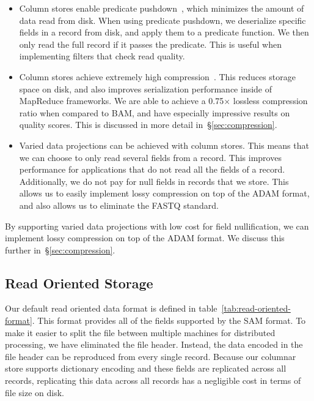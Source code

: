 \documentclass[10pt,twocolumn]{article}
\begin{document}
\begin{itemize}
\item Column stores enable predicate pushdown~\cite{lamb12}, which minimizes the amount of data read from disk. When
using predicate pushdown, we deserialize specific fields in a record from disk, and apply them to a predicate function. We
then only read the full record if it passes the predicate. This is useful when implementing filters that check read quality.
\item Column stores achieve extremely high compression~\cite{abadi06}. This reduces storage space on disk, and also improves
serialization performance inside of MapReduce frameworks. We are able to achieve a 0.75$\times$ lossless compression
ratio when compared to BAM, and have especially impressive results on quality scores. This is discussed in more
detail in~\S\ref{sec:compression}.
\item Varied data projections can be achieved with column stores. This means that we can choose to only read several
fields from a record. This improves performance for applications that do not read all the fields of a record. Additionally,
we do not pay for null fields in records that we store. This allows us to easily implement lossy compression on top of the
ADAM format, and also allows us to eliminate the FASTQ standard.
\end{itemize}

By supporting varied data projections with low cost for field nullification, we can implement lossy compression on top
of the ADAM format. We discuss this further in~\S\ref{sec:compression}.

\subsection{Read Oriented Storage}
\label{sec:read-oriented-storage}

Our default read oriented data format is defined in table~\ref{tab:read-oriented-format}. This format provides all of the
fields supported by the SAM format. To make it easier to split the file between multiple machines for distributed processing,
we have eliminated the file header. Instead, the data encoded in the file header can be reproduced from every single
record. Because our columnar store supports dictionary encoding and these fields are replicated across all records,
replicating this data across all records has a negligible cost in terms of file size on disk.
\end{document}
